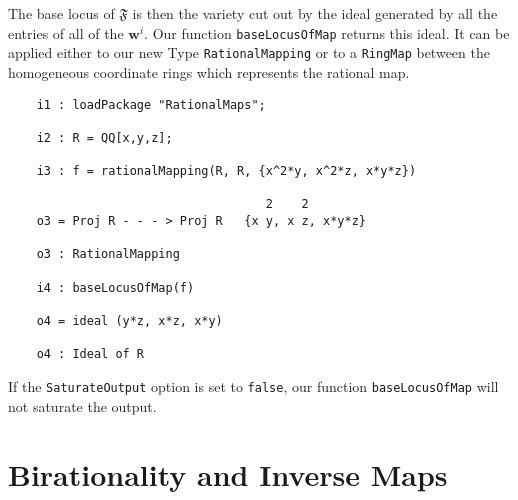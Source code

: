 \documentclass[11pt]{amsart}%
\numberwithin{equation}{theorem}
\renewcommand{\:}{\colon}
\theoremstyle{theorem}
\begin{document}
The base locus of $\mathfrak{F}$ is then the variety cut out by the ideal generated by all the entries of all of the $\mathbf w^i$. Our function {\tt baseLocusOfMap}  returns this ideal.  It can be applied either to our new Type {\tt RationalMapping} or to a {\tt RingMap} between the homogeneous coordinate rings which represents the rational map.
{\scriptsize\color{blue}
\begin{verbatim}
    i1 : loadPackage "RationalMaps";

    i2 : R = QQ[x,y,z];    

    i3 : f = rationalMapping(R, R, {x^2*y, x^2*z, x*y*z})    

                                    2    2
    o3 = Proj R - - - > Proj R   {x y, x z, x*y*z}    

    o3 : RationalMapping    

    i4 : baseLocusOfMap(f)    

    o4 = ideal (y*z, x*z, x*y)    

    o4 : Ideal of R    
\end{verbatim}
}
{\normalsize}
If the \verb=SaturateOutput= option is set  to {\tt false}, our function {\tt baseLocusOfMap} will not saturate the output.


\section{Birationality and Inverse Maps}
\end{document}
